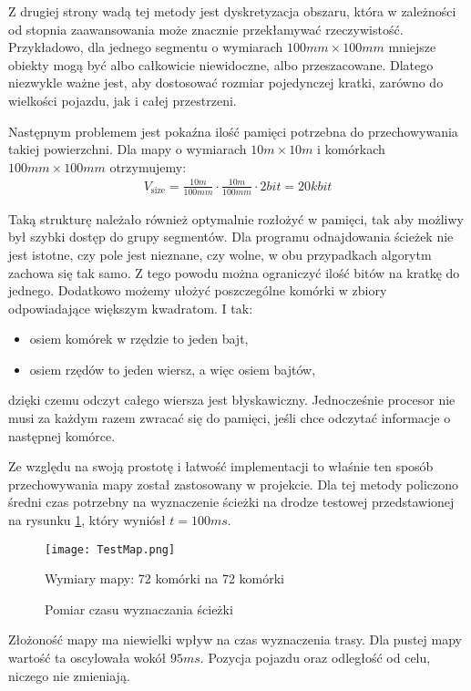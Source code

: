             Z drugiej strony wadą tej metody jest dyskretyzacja obszaru, która w zależności od stopnia zaawansowania może znacznie przekłamywać rzeczywistość.
            Przykładowo, dla jednego segmentu o wymiarach $100mm \times 100mm$ mniejsze obiekty mogą być albo całkowicie niewidoczne, albo przeszacowane.
            Dlatego niezwykle ważne jest, aby dostosować rozmiar pojedynczej kratki, zarówno do wielkości pojazdu, jak i całej przestrzeni.

            Następnym problemem jest pokaźna ilość pamięci potrzebna do przechowywania takiej powierzchni.
            Dla mapy o wymiarach $10m \times 10m$ i komórkach $100mm \times 100mm$ otrzymujemy:
            \begin{gather}
                V_{\text{size}} = \frac{10m}{100mm} \cdot \frac{10m}{100mm} \cdot 2bit = 20kbit
            \end{gather}

            Taką strukturę należało również optymalnie rozłożyć w pamięci, tak aby możliwy był szybki dostęp do grupy segmentów.
            Dla programu odnajdowania ścieżek nie jest istotne, czy pole jest nieznane, czy wolne, w obu przypadkach algorytm zachowa się tak samo.
            Z tego powodu można ograniczyć ilość bitów na kratkę do jednego.
            Dodatkowo możemy ułożyć poszczególne komórki w zbiory odpowiadające większym kwadratom.
            I tak:
            \begin{itemize}[label = -]
                \item osiem komórek w rzędzie to jeden bajt,
                \item osiem rzędów to jeden wiersz, a więc osiem bajtów,
            \end{itemize}
            dzięki czemu odczyt całego wiersza jest błyskawiczny.
            Jednocześnie procesor nie musi za każdym razem zwracać się do pamięci, jeśli chce odczytać informacje o następnej komórce.

            Ze względu na swoją prostotę i łatwość implementacji to właśnie ten sposób przechowywania mapy został zastosowany w projekcie.
            Dla tej metody policzono średni czas potrzebny na wyznaczenie ścieżki na drodze testowej przedstawionej na rysunku \ref{fig:pathFindingTime}, który wyniósł $t=100ms$.
%
            \begin{figure}
                \centering
                \texttt{[image: TestMap.png]}
                \caption{Pomiar czasu wyznaczania ścieżki}
                Wymiary mapy: 72 komórki na 72 komórki
                \label{fig:pathFindingTime}
            \end{figure}
%
            Złożoność mapy ma niewielki wpływ na czas wyznaczenia trasy.
            Dla pustej mapy wartość ta oscylowała wokół $95ms$.
            Pozycja pojazdu oraz odległość od celu, niczego nie zmieniają.

